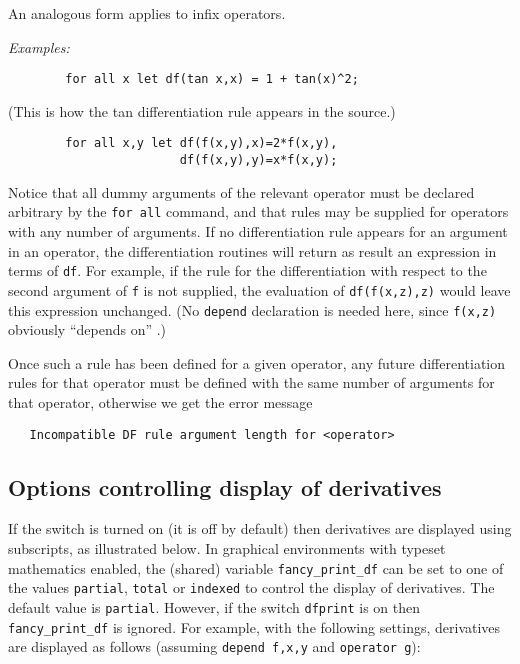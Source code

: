 An analogous form applies to infix operators.

\textit{Examples:}
\begin{verbatim}
        for all x let df(tan x,x) = 1 + tan(x)^2;
\end{verbatim}
(This is how the tan differentiation rule appears in the {\REDUCE}
source.)
\begin{verbatim}
        for all x,y let df(f(x,y),x)=2*f(x,y),
                        df(f(x,y),y)=x*f(x,y);
\end{verbatim}
Notice that all dummy arguments of the relevant operator must be declared
arbitrary by the \texttt{for all} command, and that rules may be supplied for
operators with any number of arguments.  If no differentiation rule
appears for an argument in an operator, the differentiation routines will
return as result an expression in terms of \texttt{df}.  For
example, if the rule for the differentiation with respect to the second
argument of \texttt{f} is not supplied, the evaluation of \texttt{df(f(x,z),z)}
would leave this expression unchanged. (No \texttt{depend} declaration
is needed here, since \texttt{f(x,z)} obviously ``depends on'' .)

Once such a rule has been defined for a given operator, any future
differentiation rules for that operator must be
defined with the same number of arguments for that operator, otherwise we
get the error message
\begin{verbatim}
   Incompatible DF rule argument length for <operator>
\end{verbatim}


\subsection{Options controlling display of derivatives}
\hypertarget{switch:DFPRINT}{}

If the switch  is turned on (it is
off by default) then derivatives are displayed using subscripts, as
illustrated below.  In graphical environments with typeset mathematics
enabled, the (shared) variable
\texttt{fancy\_print\_df} can be set to one
of the values \texttt{partial},
\texttt{total} or \texttt{indexed} to
control the display of derivatives.  The default value is
\texttt{partial}.  However, if the switch \texttt{dfprint} is on then
\texttt{fancy\_print\_df} is ignored.  For example, with the following
settings, derivatives are displayed as follows (assuming
\texttt{depend f,x,y} and \texttt{operator g}):

